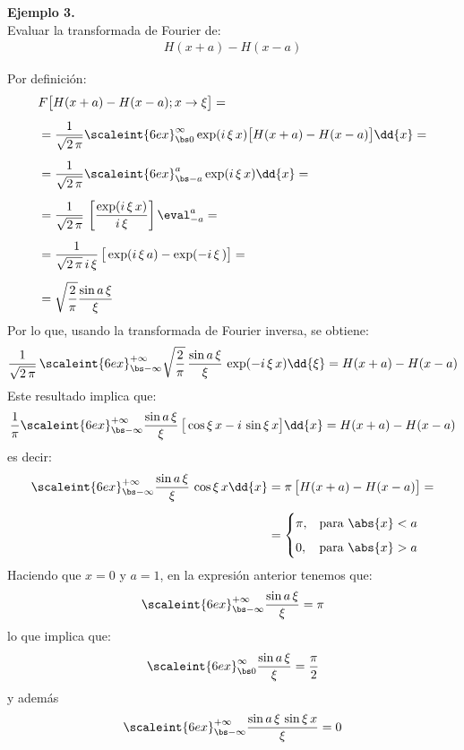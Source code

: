 \noindent
\textbf{Ejemplo 3.}
\\
Evaluar la transformada de Fourier de:
\begin{align*}
H (x + a) - H (x - a)
\end{align*}

Por definición:
\begin{align*}
&F \big[ H(x + a) - H(x - a); x \to \xi \big] = \\[0.5em]
&= \dfrac{1}{\sqrt{2\, \pi}} \scaleint{6ex}_{\bs 0}^{\infty} \exp(i \, \xi \, x) \big[ H (x + a) - H (x - a) \big] \dd{x} = \\[0.5em]
&= \dfrac{1}{\sqrt{2\, \pi}} \scaleint{6ex}_{\bs -a}^{a} \exp(i \, \xi \, x) \dd{x} = \\[0.5em]
&= \dfrac{1}{\sqrt{2\, \pi}} \, \left[ \dfrac{\exp(i \, \xi \, x)}{i \, \xi} \right] \eval_{-a}^{a} = \\[0.5em]
&= \dfrac{1}{\sqrt{2\, \pi} \, i \, \xi} \, \big[ \exp(i \, \xi \, a) - \exp(-i \, \xi \, ) \big] = \\[0.5em]
&= \sqrt{\dfrac{2}{\pi}} \dfrac{\sin a \, \xi}{\xi}
\end{align*}
Por lo que, usando la transformada de Fourier inversa, se obtiene:
\begin{align*}
\dfrac{1}{\sqrt{2 \, \pi}} \, \scaleint{6ex}_{\bs -\infty}^{+\infty} \sqrt{\dfrac{2}{\pi}} \, \dfrac{\sin a \, \xi}{\xi} \, \exp(- i \, \xi \, x) \dd{\xi}  = H(x + a) - H(x- a)
\end{align*}
Este resultado implica que:
\begin{align*}
\dfrac{1}{\pi} \scaleint{6ex}_{\bs -\infty}^{+\infty} \dfrac{\sin a \, \xi}{\xi} \, \big[ \cos \xi \, x - i \, \sin \xi \, x \big] \dd{x} = H(x + a) - H(x - a)
\end{align*}
es decir:
\begin{align*}
\scaleint{6ex}_{\bs -\infty}^{+\infty} \dfrac{\sin a \, \xi}{\xi} \, \cos \xi \, x \dd{x} &= \pi \, \big[ H(x + a) - H(x - a) \big]  = \\[0.5em]
&= \begin{cases}
\pi, & \mbox{para  } \abs{x} < a \\[0.5em]
0, & \mbox{para  } \abs{x} > a
\end{cases}
\end{align*}
Haciendo que $x = 0$ y $a = 1$, en la expresión anterior tenemos que:
\begin{align*}
\scaleint{6ex}_{\bs -\infty}^{+\infty} \dfrac{\sin a \, \xi}{\xi} = \pi
\end{align*}
lo que implica que:
\begin{align*}
\scaleint{6ex}_{\bs 0}^{\infty} \dfrac{\sin a \, \xi}{\xi} = \dfrac{\pi}{2}
\end{align*}
y además
\begin{align*}
\scaleint{6ex}_{\bs -\infty}^{+\infty} \dfrac{\sin a \, \xi \, \sin \xi \, x}{\xi} = 0
\end{align*}

